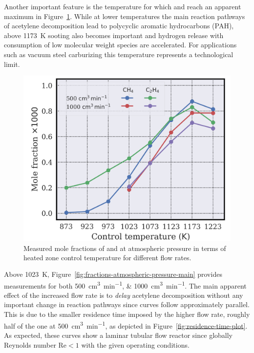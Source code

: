 \documentclass[final,3p,times,twocolumn,sort&compress]{elsarticle}
\newcommand{\sccm}{\cubic\centi\metre\per\minute}
\begin{document}
Another important feature is the temperature for which  and  reach an apparent maximum in Figure~\ref{fig:fractions-atmospheric-pressure-other}. While at lower temperatures the main reaction pathways of acetylene decomposition lead to polycyclic aromatic hydrocarbons (PAH), above \SI{1173}{\kelvin} sooting also becomes important and hydrogen release with consumption of low molecular weight species are accelerated. For applications such as vacuum steel carburizing this temperature represents a technological limit.

\begin{figure}[h]
	\centering
	\includegraphics[width=\linewidth]
	{reworking/fractions_atmospheric_pressure_other}
	\caption{\label{fig:fractions-atmospheric-pressure-other}Measured mole fractions of  and  at atmospheric pressure in terms of heated zone control temperature for different flow rates.}
\end{figure}

Above \SI{1023}{\kelvin}, Figure~\ref{fig:fractions-atmospheric-pressure-main}  provides measurements for both \SIlist{500;1000}{\sccm}. The main apparent effect of the increased flow rate is to \emph{delay} acetylene decomposition without any important change in reaction pathways since curves follow approximately parallel. This is due to the smaller residence time imposed by the higher flow rate, roughly half of the one at \SI{500}{\sccm}, as depicted in Figure~\ref{fig:residence-time-plot}. As expected, these curves show a laminar tubular flow reactor since globally Reynolds number $\mathrm{Re}<1$ with the given operating conditions.
\end{document}

